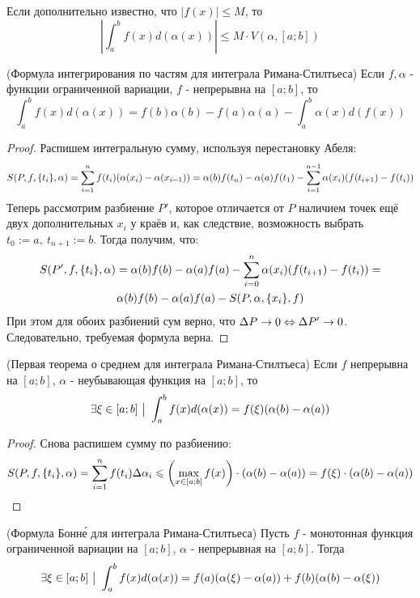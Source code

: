 \begin{corollary}
	Если дополнительно известно, что $|f(x)| \le M$, то
	\[
		\left|\int_a^b f(x) d(\alpha(x))\right| \le M \cdot V(\alpha, [a; b])
	\]
\end{corollary}

\begin{theorem} (Формула интегрирования по частям для интеграла Римана-Стилтьеса)
	Если $f, \alpha$ - функции ограниченной вариации, $f$ - непрерывна на $[a; b]$, то
	\[
		\int_a^b f(x)d(\alpha(x)) = f(b)\alpha(b) - f(a)\alpha(a) - \int_a^b \alpha(x)d(f(x))
	\]
\end{theorem}

\begin{proof}
	Распишем интегральную сумму, используя перестановку Абеля:
	\[
		S(P, f, \{t_i\}, \alpha) = \sum\limits_{i=  1}^nf(t_i)(\alpha(x_i) - \alpha(x_{i - 1})) = \alpha(b)f(t_n) - \alpha(a)f(t_1) - \sum\limits_{i = 1}^{n - 1}\alpha(x_i)(f(t_{i + 1}) - f(t_i))
	\]
	Теперь рассмотрим разбиение $P'$, которое отличается от $P$ наличием точек ещё двух дополнительных $x_i$ у краёв и, как следствие, возможность выбрать $t_0 := a,\  t_{n + 1} := b$.
	Тогда получим, что:
	\begin{multline*}
		S(P', f, \{t_i\}, \alpha)  = \alpha(b)f(b) - \alpha(a)f(a) - \sum\limits_{i = 0}^n \alpha(x_i)(f(t_{i + 1}) - f(t_i)) =
		\\
		\alpha(b)f(b) - \alpha(a)f(a) - S(P, \alpha, \{x_i\}, f)
	\end{multline*}
	При этом для обоих разбиений сум верно, что $\Delta P \to 0 \Leftrightarrow \Delta P' \to 0$. Следовательно, требуемая формула верна.
\end{proof}

\begin{theorem} (Первая теорема о среднем для интеграла Римана-Стилтьеса)
	Если $f$ непрерывна на $[a; b]$, $\alpha$ - неубывающая функция на $[a; b]$, то
	\[
		\exists \xi \in [a; b] \ \big|\  \int_a^b f(x) d(\alpha(x)) = f(\xi)(\alpha(b) - \alpha(a))
	\]
\end{theorem}

\begin{proof}
	Снова распишем сумму по разбиению:
	\[
		S(P, f, \{t_i\}, \alpha) = \sum\limits_{i = 1}^n f(t_i) \Delta \alpha_i \leqslant \left(\max\limits_{x \in [a; b]} f(x)\right) \cdot (\alpha(b) - \alpha(a)) = f(\xi) \cdot (\alpha(b) - \alpha(a))
	\]
\end{proof}

\begin{theorem} (Формула Бонн\'{е} для интеграла Римана-Стилтьеса)
	Пусть $f$ - монотонная функция ограниченной вариации на $[a; b]$, $\alpha$ - непрерывная на $[a; b]$. Тогда
	\[
		\exists \xi \in [a; b] \ \big|\  \int_a^b f(x) d(\alpha(x)) = f(a)(\alpha(\xi) - \alpha(a)) + f(b)(\alpha(b) - \alpha(\xi))
	\]
\end{theorem}

